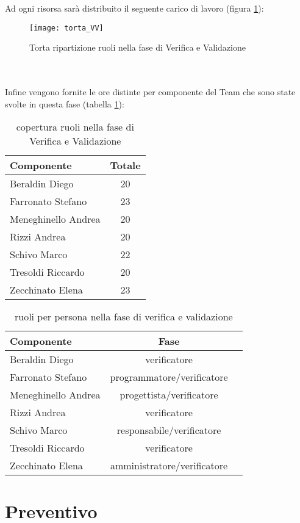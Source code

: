 \clearpage
Ad ogni risorsa sarà distribuito il seguente carico di lavoro (figura \ref{fig:ruolivv}):\\
\begin{figure}[h!]
\centering
  \texttt{[image: torta\_VV]}
\caption{Torta ripartizione ruoli nella fase di Verifica e Validazione}\label{fig:ruolivv}
\end{figure}
\\\\
Infine vengono fornite le ore distinte per componente del Team che sono state svolte in questa fase (tabella \ref{tab:ruolivv2}):\\
\begin{table}[h]
\centering
\begin{tabular}{|l|c|}
\hline
Componente& Totale \\
\hline
Beraldin Diego & 20\\
Farronato Stefano & 23\\
Meneghinello Andrea & 20\\
Rizzi Andrea & 20\\
Schivo Marco & 22\\
Tresoldi Riccardo & 20\\
Zecchinato Elena & 23\\
\hline
\end{tabular}
\caption{copertura ruoli nella fase di Verifica e Validazione}\label{tab:ruolivv2}
\end{table}

\begin{table}[h!]
\centering
\begin{tabular}{|l|c|c|}
\hline
Componente& Fase\\
\hline
Beraldin Diego &verificatore\\
Farronato Stefano & programmatore/verificatore\\
Meneghinello Andrea &progettista/verificatore\\
Rizzi Andrea &verificatore\\
Schivo Marco &responsabile/verificatore\\
Tresoldi Riccardo &verificatore\\
Zecchinato Elena &amministratore/verificatore\\
\hline
\end{tabular}
\caption{ruoli per persona nella fase di verifica e validazione}\label{tab:ruolivv3}
\end{table}

\clearpage
\section{Preventivo}
